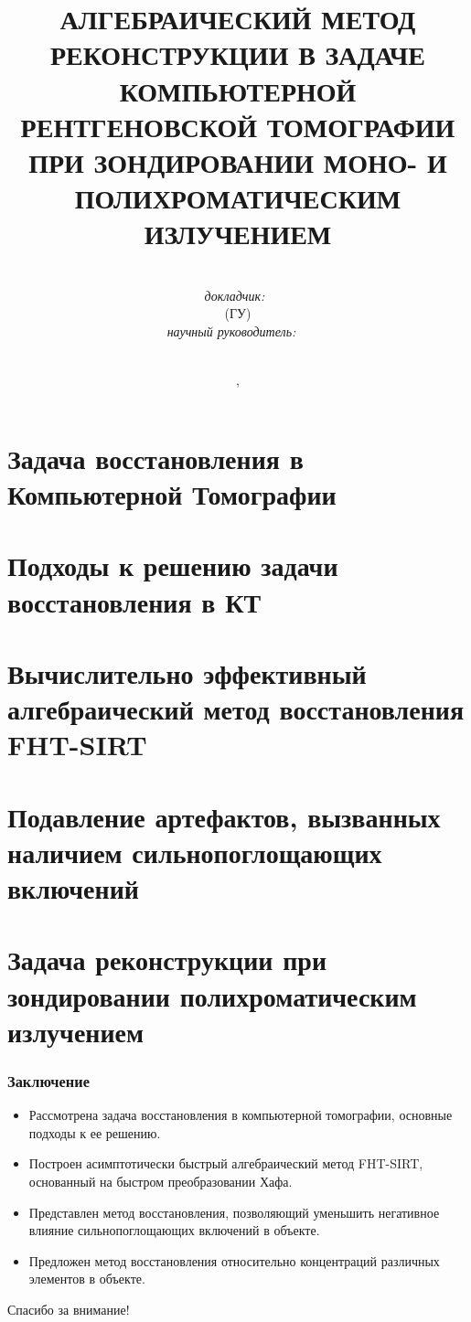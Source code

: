 \documentclass[12pt]{beamer}
\title{\small{
  АЛГЕБРАИЧЕСКИЙ МЕТОД РЕКОНСТРУКЦИИ В ЗАДАЧЕ КОМПЬЮТЕРНОЙ РЕНТГЕНОВСКОЙ ТОМОГРАФИИ ПРИ ЗОНДИРОВАНИИ МОНО- И ПОЛИХРОМАТИЧЕСКИМ ИЗЛУЧЕНИЕМ
}}
\author{\small{%
\ \vspace{10pt} \\
\emph{докладчик:}~\thesisAuthorShort\\ 
\thesisOrganizationShort (ГУ)\\%
\vspace{10pt}
\emph{научный руководитель:}~\supervisorRegaliaShort~\supervisorFioShort \\
\supervisorOrganisationShort
}\\%
\vspace{30pt}%
\vspace{20pt}%
}
\date{\small{\thesisCity, \thesisYear}}
\begin{document}
\maketitle

\section{Задача восстановления в Компьютерной Томографии}


\section{Подходы к решению задачи восстановления в КТ}


\section{Вычислительно эффективный алгебраический метод восстановления FHT-SIRT}


\section{Подавление артефактов, вызванных наличием сильнопоглощающих включений}


\section{Задача реконструкции при зондировании полихроматическим излучением}



\begin{frame}
\frametitle{Заключение}
\begin{itemize}
  \item Рассмотрена задача восстановления в компьютерной томографии, основные подходы к ее решению.
  \item Построен асимптотически быстрый алгебраический метод FHT-SIRT, основанный на быстром преобразовании Хафа.
  \item Представлен метод восстановления, позволяющий уменьшить негативное влияние сильнопоглощающих включений в объекте.
  \item Предложен метод восстановления относительно концентраций различных элементов в объекте.
\end{itemize}
\end{frame}

\begin{frame}
\centering
\large {Спасибо за внимание!}
\end{frame}
\end{document}

